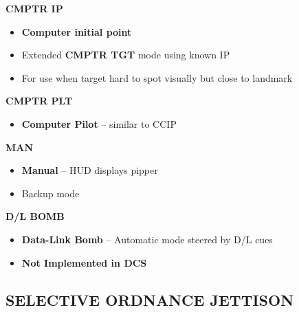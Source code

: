 \documentclass[fontMetropolis]{TechCheck}
\begin{document}
\begin{tableitemize}
{\begin{subitemize}
\begin{itemize}
			\end{itemize}
			\item \textbf{CMPTR IP}
			\begin{itemize}
				\item \textbf{Computer initial point}
				\item Extended \textbf{CMPTR TGT} mode using known IP
				\item For use when target hard to spot visually but close to landmark
			\end{itemize}
			\item \textbf{CMPTR PLT}
			\begin{itemize}
				\item \textbf{Computer Pilot} -- similar to CCIP
			\end{itemize}
			\item \textbf{MAN}
			\begin{itemize}
				\item \textbf{Manual} -- HUD displays pipper
				\item Backup mode
			\end{itemize}
			\item \textbf{D/L BOMB}
			\begin{itemize}
				\item \textbf{Data-Link Bomb} -- Automatic mode steered by D/L cues
				\item \textbf{Not Implemented in DCS}
			\end{itemize}
		\end{subitemize}}
	\end{tableitemize}


	\subsection{SELECTIVE ORDNANCE JETTISON}
	\begin{tablenumerate}
	\end{tablenumerate}
\end{document}
